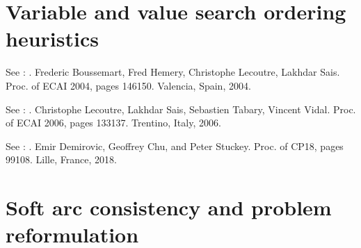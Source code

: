 \documentclass[letterpaper,10pt,openany,oneside,english]{sphinxmanual}
\begin{document}
\section{Variable and value search ordering heuristics}
\label{\detokenize{ref/ref_modules:variable-and-value-search-ordering-heuristics}}

\begin{fulllineitems}

\pysigstartsignatures
{}
\pysigstopsignatures
\sphinxAtStartPar
See : . Frederic Boussemart, Fred Hemery, Christophe Lecoutre, Lakhdar Sais. Proc. of ECAI 2004, pages 146\sphinxhyphen{}150. Valencia, Spain, 2004.

\sphinxAtStartPar
See : . Christophe Lecoutre, Lakhdar Sais, Sebastien Tabary, Vincent Vidal. Proc. of ECAI 2006, pages 133\sphinxhyphen{}137. Trentino, Italy, 2006.

\sphinxAtStartPar
See : . Emir Demirovic, Geoffrey Chu, and Peter Stuckey. Proc. of CP\sphinxhyphen{}18, pages 99\textendash{}108. Lille, France, 2018. 

\end{fulllineitems}



\section{Soft arc consistency and problem reformulation}
\label{\detokenize{ref/ref_modules:soft-arc-consistency-and-problem-reformulation}}
\end{document}
